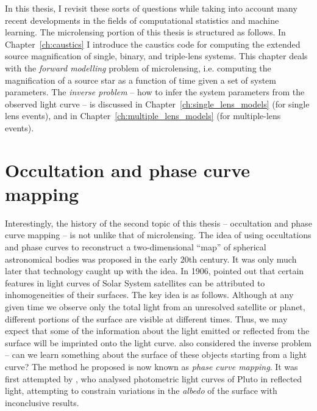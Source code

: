 \documentclass[12pt,dvipsnames]{report}
\newcommand{\ssf}[1]{\textsf{#1}}
\begin{document}
In this thesis, I revisit these sorts of questions while taking into account many recent developments in the fields of
computational statistics and machine learning. 
The microlensing portion of this thesis is structured as follows. 
In Chapter~\ref{ch:caustics} I introduce the \ssf{caustics} code for computing the 
extended source magnification of single, binary, and triple-lens systems. This chapter 
deals with the \emph{forward modelling} problem of microlensing, i.e. computing the
magnification of a source star as a function of time given a set of system parameters.
The \emph{inverse problem} -- how to infer the system parameters from the observed 
light curve -- is discussed in Chapter~\ref{ch:single_lens_models} (for single lens events), 
and in Chapter~\ref{ch:multiple_lens_models} (for multiple-lens events).


\section{Occultation and phase curve mapping}
Interestingly, the history of the second topic of this thesis 
-- occultation and phase curve mapping -- is not unlike that of microlensing.
The idea of using occultations and phase curves to reconstruct a two-dimensional ``map''
of spherical astronomical bodies was proposed in the early 20th century. 
It  was only much later that technology caught up with the idea. In 1906,
\citet{1906ApJ....24....1R} pointed out that certain features in light curves
of Solar System satellites can be attributed to inhomogeneities of their
surfaces. The key idea is as follows. Although at any given time we observe only the
total light from an unresolved satellite or planet, different portions of the
surface are visible at different times. Thus, we may expect that some of the
information about the light emitted or reflected from the surface 
will be imprinted onto the light curve. 
\citet{1906ApJ....24....1R} also considered the inverse problem -- can we learn something about the surface of
these objects starting from a light curve? The method he proposed is now known
as \emph{phase curve mapping}. It was first attempted by
\citet{1972ApJ...174..449L}, who analysed photometric light curves of Pluto in
reflected light, attempting to constrain variations in the \emph{albedo} of the
surface with inconclusive results.
\end{document}
